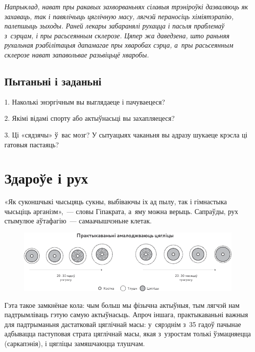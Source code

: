 \emph{Напрыклад, нават пры ракавых захворваньнях сілавыя трэніроўкі дазваляюць як захаваць, так і павялічыць цяглічную масу, лягчэй пераносіць хіміятэрапію, палепшыць зыходы. Раней лекары забаранялі рухацца і пасьля праблемаў з~сэрцам, і пры расьсеянным склерозе. Цяпер жа даведзена, што раньняя рухальная рэабілітацыя дапамагае пры хваробах сэрца, а~пры расьсеянным склерозе нават запавольвае разьвіцьцё хваробы.}

\subsection*{Пытаньні і заданьні}

1. Наколькі энэргічным вы выглядаеце і пачуваецеся?

2. Якімі відамі спорту або актыўнасьці вы захапляецеся?

3. Ці «сядзячы» ў~вас мозг? У сытуацыях чаканьня вы адразу шукаеце крэсла ці гатовыя пастаяць?


\section{Здароўе і рух}

«Як суконшчыкі чысьцяць сукны, выбіваючы іх ад пылу, так і гімнастыка чысьціць арганізм»,~--- словы Гіпакрата, а~яму можна верыць. Сапраўды, рух стымулюе аўтафагію~--- самаачышчэньне клетак. 


\begin{figure}[htb!]
  \centering
  \includegraphics[scale=1.2]{willpower/ch5/1.pdf}
\end{figure}

Гэта такое замкнёнае кола: чым больш мы фізычна актыўныя, тым лягчэй нам падтрымліваць гэтую самую актыўнасьць. Апроч іншага, практыкаваньні важныя для падтрыманьня дастатковай цяглічнай масы: у~сярэднім з~35 гадоў пачынае адбывацца паступовая страта цяглічнай масы, якая з~узростам толькі ўзмацняецца (саркапэнія), і цягліцы замяшчаюцца тлушчам.

